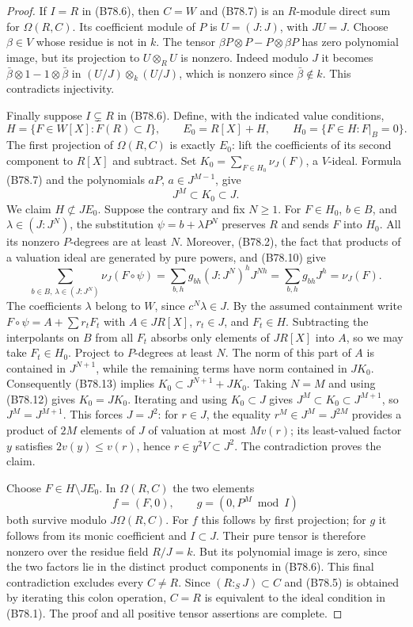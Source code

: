 \begin{proof}
If $I=R$ in (B78.6), then $C=W$ and (B78.7) is an $R$-module direct
sum for $\Omega(R,C)$. Its coefficient module of $P$ is
$U=(J:J)$, with $JU=J$. Choose $\beta\in V$ whose residue is not in
$k$. The tensor $\beta P\otimes P-P\otimes\beta P$ has zero polynomial
image, but its projection to $U\otimes_R U$ is nonzero. Indeed modulo
$J$ it becomes $\bar\beta\otimes1-1\otimes\bar\beta$ in
$(U/J)\otimes_k(U/J)$, which is nonzero since $\bar\beta\notin k$.
This contradicts injectivity.

Finally suppose $I\subsetneq R$ in (B78.6). Define, with the indicated
value conditions,
\[
 H=\{F\in W[X]:F(R)\subset I\},\qquad E_0=R[X]+H,
 \qquad H_0=\{F\in H:F|_B=0\}.
                                                        \tag{B78.11}
\]
The first projection of $\Omega(R,C)$ is exactly $E_0$: lift the
coefficients of its second component to $R[X]$ and subtract.
Set $K_0=\sum_{F\in H_0}\nu_J(F)$, a $V$-ideal. Formula (B78.7)
and the polynomials $aP$, $a\in J^{M-1}$, give
\[
                            J^M\subset K_0\subset J.    \tag{B78.12}
\]
We claim $H\not\subset JE_0$. Suppose the contrary and fix $N\ge1$.
For $F\in H_0$, $b\in B$, and $\lambda\in(J:J^N)$, the substitution
$\psi=b+\lambda P^N$ preserves $R$ and sends $F$ into $H_0$.
All its nonzero $P$-degrees are at least $N$. Moreover, (B78.2), the
fact that products of a valuation ideal are generated by pure powers,
and (B78.10) give
\[
 \sum_{b\in B,\,\lambda\in(J:J^N)}\nu_J(F\circ\psi)
       =\sum_{b,h}g_{bh}(J:J^N)^hJ^{Nh}
       =\sum_{b,h}g_{bh}J^h=\nu_J(F).                    \tag{B78.13}
\]
The coefficients $\lambda$ belong to $W$, since $c^N\lambda\in J$.
By the assumed containment write
$F\circ\psi=A+\sum r_tF_t$ with $A\in JR[X]$, $r_t\in J$,
and $F_t\in H$. Subtracting the interpolants on $B$ from all $F_t$
absorbs only elements of $JR[X]$ into $A$, so we may take $F_t\in H_0$.
Project to $P$-degrees at least $N$. The norm of this part of $A$ is
contained in $J^{N+1}$, while the remaining terms have norm contained
in $JK_0$. Consequently (B78.13) implies
$K_0\subset J^{N+1}+JK_0$. Taking $N=M$ and using (B78.12) gives
$K_0=JK_0$. Iterating and using $K_0\subset J$ gives
$J^M\subset K_0\subset J^{M+1}$, so $J^M=J^{M+1}$.
This forces $J=J^2$: for $r\in J$, the equality
$r^M\in J^M=J^{2M}$ provides a product of $2M$ elements of $J$
of valuation at most $Mv(r)$; its least-valued factor $y$ satisfies
$2v(y)\le v(r)$, hence $r\in y^2V\subset J^2$.
The contradiction proves the claim.

Choose $F\in H\setminus JE_0$. In $\Omega(R,C)$ the two elements
\[
                       f=(F,0),\qquad g=(0,P^M\bmod I)
\]
both survive modulo $J\Omega(R,C)$. For $f$ this follows by first
projection; for $g$ it follows from its monic coefficient and
$I\subset J$. Their pure tensor is therefore nonzero over the residue
field $R/J=k$. But its polynomial image is zero, since the two
factors lie in the distinct product components in (B78.6).
This final contradiction excludes every $C\ne R$.
Since $(R:_S J)\subset C$ and (B78.5) is obtained by iterating this
colon operation, $C=R$ is equivalent to the ideal condition in
(B78.1). The proof and all positive tensor assertions are complete.
\end{proof}
